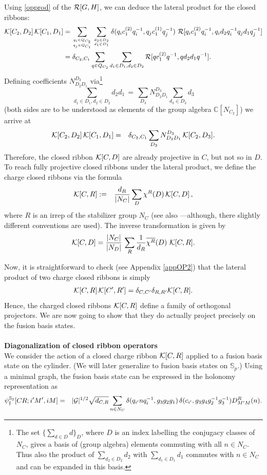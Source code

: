 \documentclass[nofootinbib,superscriptaddress,eqsecnum,tightenlines,11pt]{revtex4-1}
\def\mG{\mathcal{G}}
\def\be{\begin{equation}}
\def\ee{\end{equation}}
\def\ba{\begin{eqnarray}}
\def\ea{\end{eqnarray}}
\renewcommand{\S}{{\mathbb S}}
\begin{document}
Using \eqref{opprod} of the ${\cal R}[G,H]$, we can deduce the lateral product for the closed ribbons:
\begin{align}
	{\cal K}[C_2,D_2]   \, {\cal K}[C_1,D_1] &= 
	\sum_{q_i \in Q_{C_2} \atop q_j \in Q_{C_1}}\sum_{d_2 \in D_2 \atop d_1 \in D_1}\delta(q_i c^{(2)}_1q_i^{-1},q_j c^{(1)}_1 q_j^{-1})
\,\,	\mathcal{R}[q_i c^{(2)}_1 q_i^{-1},q_i d_2 q_i^{-1} q_j d_1 q_j^{-1}] \\
	& = \delta_{C_2,C_1} \sum_{q \in Q_{C_2}} \sum_{d_1 \in D_1, d_2 \in D_2}
	{\cal R}[ q c^{(2)}_1 q^{-1},  q d_2 d_1 q^{-1}].
	\label{opprodK}
\end{align}
Defining coefficients %
 $N^{D_3}_{D_2D_1}$ via\footnote{ The set $\{\sum_{d \in D} d\}_D$, where $D$ is an index labelling the conjugacy classes of $N_C$,  gives a basis of (group algebra) elements commuting with all $n \in N_C$. Thus also the product of $\sum_{d_2 \in D_2} d_2$ with $\sum_{d_1 \in D_1} d_1$ commutes with $n\in N_C$ and can be expanded in this basis.}
%
 \be
 \sum_{d_1\in D_1,d_2\in D_2} d_2 d_1 \,=\, \sum_{D_3} N^{D_3}_{D_2D_1} \sum_{d_3 \in D_3} d_3
 \ee
  (both sides are to be understood as elements of the group algebra $\mathbb{C}[N_{C_2}]$) we arrive at
\ba
{\cal K}[C_2,D_2]  \, {\cal K}[C_1,D_1] &=& \delta_{C_2,C_1} \sum_{D_3}  N^{D_3}_{D_2D_1} \, {\cal K}[C_2,D_3]   .
\ea
Therefore, the closed ribbon ${\cal K}[C,D]$ are already projective in $C$, but not so in $D$. 
To reach fully projective closed ribbons under the lateral product, we define the charge closed ribbons via the formula
\ba\label{defcl2}
{\cal K}[C,R] &:=& \frac{d_R}{|N_C|} \sum_{D} \chi^R(D) \, {\cal K}[C,D]\,,
\ea
 where $R$ is an irrep of the stabilizer group $N_C$ (see also \cite{Bombin}---although, there slightly different conventions are used).
The inverse transformation is given by 
\be
{\cal K}[C,D]=   \frac{|N_C|}{|N_D|} \, \sum_R \frac{1}{d_R} \overline{\chi^R}(D) \,\, {\cal K}[C,R]  .
\ee

Now, it is straightforward to check (see Appendix \ref{appOP2}) that the lateral product of two charge closed ribbons is simply
\ba
{\cal K}[C , R]\,  {\cal K}[C' , R' ]  = \delta_{C , C'} \delta_{R, R'} {\cal K}[C , R].
\ea
Hence, the charged closed ribbons ${\cal K}[C,R]$ define a family of orthogonal projectors.
We are now going to show that they do actually project precisely on the fusion basis states. \\

~\\
{\bf {Diagonalization of closed ribbon operators}}\\
We consider the action of a closed charge ribbon ${\cal K}[C,R]$ applied to a fusion basis state on the cylinder. 
(We will later generalize to fusion basis states on $\S_p$.)
Using a minimal graph, the fusion basis state can be  expressed in the holonomy representation as
\ba\label{basiscylR}
	\psi^{\S_2}_{\frak f}[CR;i'M',iM]&=&|\mG|^{1/2}
\sqrt{d_{C,R}} \sum_{n\in N_C}  \delta( q_{i'}nq_{i}^{-1},g_3g_2g_1)\, \delta(c_{i'}, g_3g_4 g_2^{-1}g_3^{-1}) D^R_{M'M}(n)  .
\ea
\end{document}

